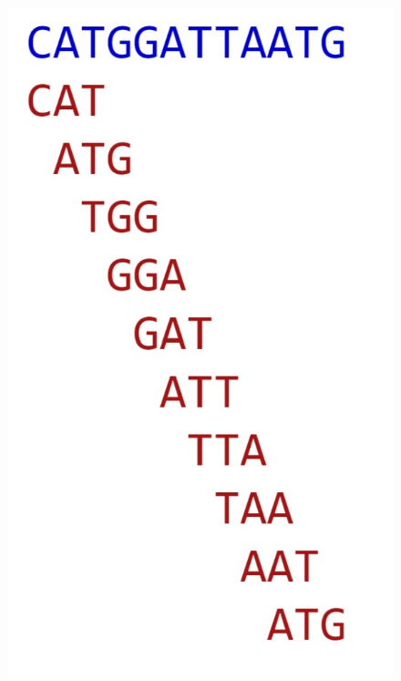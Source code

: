 \documentclass[letterpaper, 10 pt]{ieeeconf}
\begin{document}
  \begin{figure}[thpb]
    \centering
    \includegraphics[scale=0.4]{images/fig3-1.jpg}

\end{figure}
\end{document}
